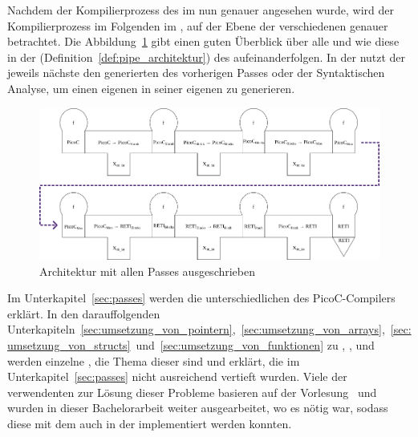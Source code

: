 Nachdem der Kompilierprozess des  im  nun genauer angesehen wurde, wird der Kompilierprozess im Folgenden im , auf der Ebene der verschiedenen  genauer betrachtet. Die Abbildung~\ref{fig:architektur_mit_allen_passes_ausgeschrieben} gibt einen guten Überblick über alle  und wie diese in der  (Definition~\ref{def:pipe_architektur}) des  aufeinanderfolgen. In der  nutzt der jeweils nächste  den generierten  des vorherigen Passes oder der Syntaktischen Analyse, um einen eigenen  in seiner eigenen  zu generieren.

\begin{figure}[H]
  \centering
  \includegraphics[width=\linewidth]{./figures/passes.png}
  \caption{Architektur mit allen Passes ausgeschrieben}
  \label{fig:architektur_mit_allen_passes_ausgeschrieben}
\end{figure}

Im Unterkapitel~\ref{sec:passes} werden die unterschiedlichen  des PicoC-Compilers erklärt. In den darauffolgenden Unterkapiteln~\ref{sec:umsetzung_von_pointern},~\ref{sec:umsetzung_von_arrays},~\ref{sec:umsetzung_von_structs}~und~\ref{sec:umsetzung_von_funktionen} zu ,  ,  und  werden einzelne , die Thema dieser  sind  und erklärt, die im Unterkapitel~\ref{sec:passes} nicht ausreichend vertieft wurden. Viele der verwendenten  zur Lösung dieser Probleme basieren auf der Vorlesung~\cite{scholl_betriebssysteme_2020} und wurden in dieser Bachelorarbeit weiter ausgearbeitet, wo es nötig war, sodass diese mit dem  auch in der  implementiert werden konnten.

